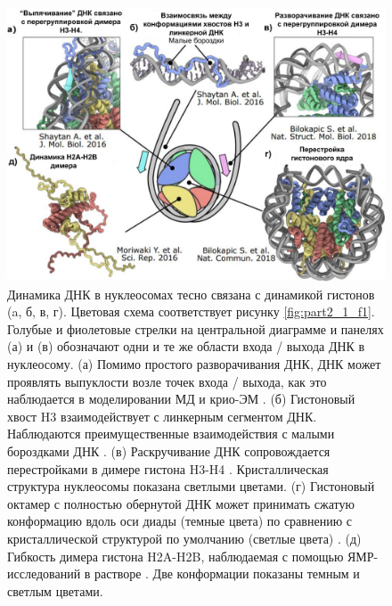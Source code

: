 \begin{figure} [H]
    \centering
    \includegraphics [width=\textwidth]{images/p2/cosb/part2_1_f3.pdf}
    \caption[Тонкие детали динамики нуклеосом]{Динамика ДНК в нуклеосомах тесно связана с динамикой гистонов (a, б, в, г). Цветовая схема соответствует рисунку \ref{fig:part2_1_f1}. Голубые и фиолетовые стрелки на центральной диаграмме и панелях (а) и (в) обозначают одни и те же области входа / выхода ДНК в нуклеосому. (а) Помимо простого разворачивания ДНК, ДНК может проявлять выпуклости возле точек входа / выхода, как это наблюдается в моделировании МД и крио-ЭМ \cite{bilokapic_histone_2018,shaytan_coupling_2016}.  (б) Гистоновый хвост H3 взаимодействует с линкерным сегментом ДНК. Наблюдаются преимущественные взаимодействия с малыми бороздками ДНК \cite{shaytan_coupling_2016}.
    (в) Раскручивание ДНК  сопровождается перестройками в димере гистона H3-H4 \cite{bilokapic_histone_2018}. Кристаллическая структура нуклеосомы показана светлыми цветами. 
    (г) Гистоновый октамер с полностью обернутой ДНК может принимать сжатую конформацию вдоль оси диады (темные цвета) по сравнению с кристаллической структурой по умолчанию (светлые цвета) \cite{bilokapic_structural_2018}. 
    (д) Гибкость димера гистона H2A-H2B, наблюдаемая с помощью ЯМР-исследований в растворе \cite{moriwaki_solution_2016}. Две конформации показаны темным и светлым цветами.}
    \label{fig:part2_1_f3}
\end{figure}















